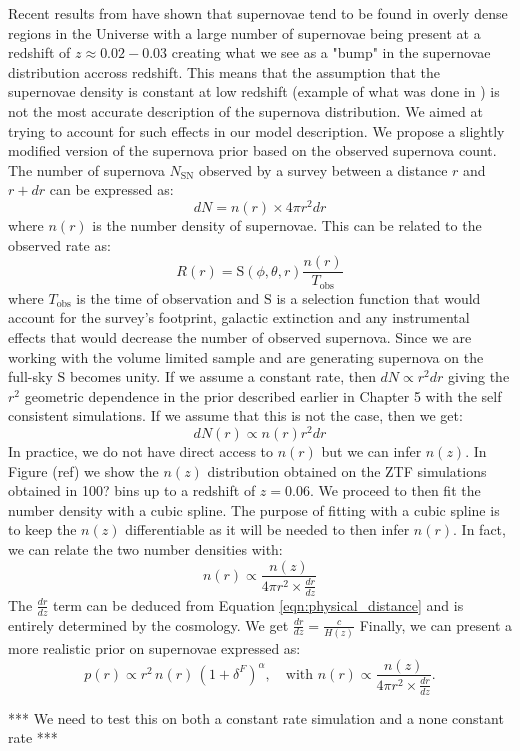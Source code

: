 Recent results from \cite{Lordet_2026} have shown that supernovae tend to be found in overly dense regions in the Universe with a large number of supernovae being present at a 
redshift of $z \approx 0.02-0.03$ creating what we see as a "bump" in the supernovae distribution accross redshift. This means that the assumption that the supernovae density is 
constant at low redshift (example of what was done in \cite{Perley_2020}) is not the most accurate description of the supernova distribution. We aimed at trying to account for such 
effects in our model description. We propose a slightly modified version of the supernova prior based on the observed supernova count. The number of supernova 
$N_{\text{SN}}$ observed by a survey between a distance $r$ and $r+dr$ can be expressed as:
\begin{equation}
    dN = n(r) \times 4 \pi r^2 dr
\end{equation}
where $n(r)$ is the number density of supernovae. This can be related to the observed rate as:
\begin{equation}
    R(r) = \mathrm{S}(\phi, \theta, r) \frac{n(r)}{T_{\text{obs}}}
\end{equation}
where $T_{\text{obs}}$ is the time of observation and $\mathrm{S}$ is a selection function that would account for the survey's footprint, galactic extinction and any 
instrumental effects that would decrease the number of observed supernova. Since we are working with the volume limited sample and are 
generating supernova on the full-sky $\mathrm{S}$ becomes unity. 
If we assume a constant rate, then $dN \propto r^2 dr$ giving the $r^2$ geometric dependence in the prior described earlier in Chapter 5 with the self consistent simulations. If we 
assume that this is not the case, then we get:
\begin{equation}
    dN(r) \propto n(r)r^2 dr
\end{equation}
In practice, we do not have direct access to $n(r)$ but we can infer $n(z)$. In Figure (ref) we show the $n(z)$ distribution obtained on the ZTF simulations obtained in 
100? bins up to a redshift of $z=0.06$. We proceed to then fit the number density with a cubic spline. The purpose of fitting with a cubic spline is to keep the $n(z)$ 
differentiable as it will be needed to then infer $n(r)$. In fact, we can relate the two number densities with:
\begin{equation}
    n(r) \propto \frac{n(z)}{4\pi r^2 \times \frac{dr}{dz}}
\end{equation}
The $\frac{dr}{dz}$ term can be deduced from Equation \ref{eqn:physical_distance} and is entirely determined by the cosmology. We get $\frac{dr}{dz} = \frac{c}{H(z)}$
Finally, we can present a more realistic prior on supernovae expressed as:
\begin{equation}
    p(r) \propto r^2\, n(r)\,(1+\delta^F)^{\alpha},
    \quad \text{with } n(r) \propto \frac{n(z)}{4\pi r^2 \times \frac{dr}{dz}}.
\end{equation}

*** We need to test this on both a constant rate simulation and a none constant rate ***
